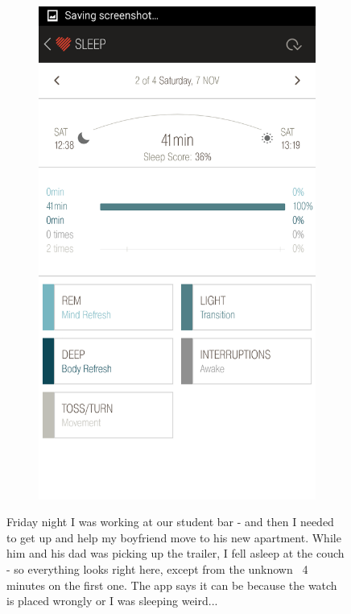 \documentclass[12pt,a4paper]{article}
\begin{document}
\begin{figure}[H]
\begin{subfigure}[b]{0.5\textwidth}
        \includegraphics[width=\textwidth]{07-11-15-2.png}
    \end{subfigure}
\caption{Friday night I was working at our student bar - and then I needed to get up and help my boyfriend move to his new apartment. While him and his dad was picking up the trailer, I fell asleep at the couch - so everything looks right here, except from the unknown ~4 minutes on the first one. The app says it can be because the watch is placed wrongly or I was sleeping weird... }
\end{figure}
\end{document}
